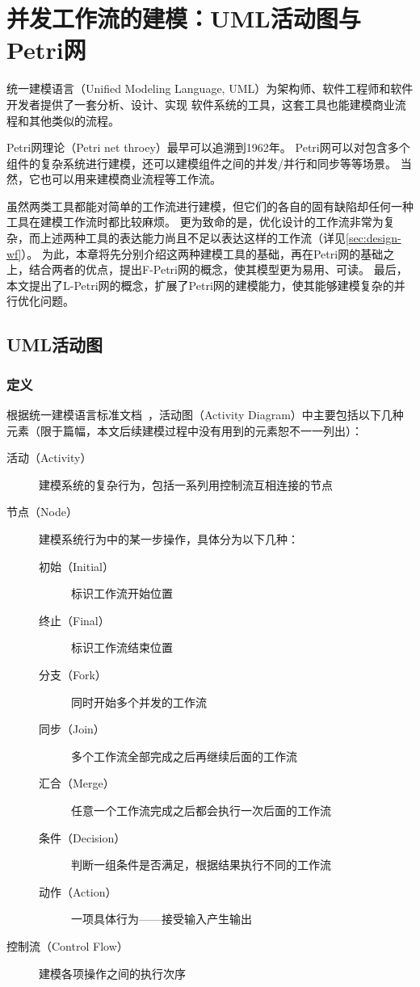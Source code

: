 \documentclass[index]{subfiles}
\begin{document}
\chapter{并发工作流的建模：UML活动图与Petri网}\label{sec:petri}
统一建模语言（Unified Modeling Language, UML）为架构师、软件工程师和软件开发者提供了一套分析、设计、实现
软件系统的工具，这套工具也能建模商业流程和其他类似的流程\cite{omg}。

Petri网理论（Petri net throey）最早可以追溯到1962年\cite{petri1962}。
Petri网可以对包含多个组件的复杂系统进行建模，还可以建模组件之间的并发/并行和同步等等场景\cite{peterson1981}。
当然，它也可以用来建模商业流程等工作流\cite{ellis1993}。

虽然两类工具都能对简单的工作流进行建模，但它们的各自的固有缺陷却任何一种工具在建模工作流时都比较麻烦。
更为致命的是，优化设计的工作流非常为复杂，而上述两种工具的表达能力尚且不足以表达这样的工作流（详见\cref{sec:design-wf}）。
为此，本章将先分别介绍这两种建模工具的基础，再在Petri网的基础之上，结合两者的优点，提出F-Petri网的概念，使其模型更为易用、可读。
最后，本文提出了L-Petri网的概念，扩展了Petri网的建模能力，使其能够建模复杂的并行优化问题。

\section{UML活动图}
\subsection{定义}
根据统一建模语言标准文档~，活动图（Activity Diagram）中主要包括以下几种元素（限于篇幅，本文后续建模过程中没有用到的元素恕不一一列出）：
\begin{description}
  \item[活动（Activity）] 建模系统的复杂行为，包括一系列用控制流互相连接的节点
  \item[节点（Node）] 建模系统行为中的某一步操作，具体分为以下几种：
  \begin{description}
    \item[初始（Initial）] 标识工作流开始位置
    \item[终止（Final）] 标识工作流结束位置
    \item[分支（Fork）] 同时开始多个并发的工作流
    \item[同步（Join）] 多个工作流全部完成之后再继续后面的工作流
    \item[汇合（Merge）] 任意一个工作流完成之后都会执行一次后面的工作流
    \item[条件（Decision）] 判断一组条件是否满足，根据结果执行不同的工作流
    \item[动作（Action）] 一项具体行为——接受输入产生输出
  \end{description}
  \item[控制流（Control Flow）] 建模各项操作之间的执行次序
\end{description}
\end{document}
